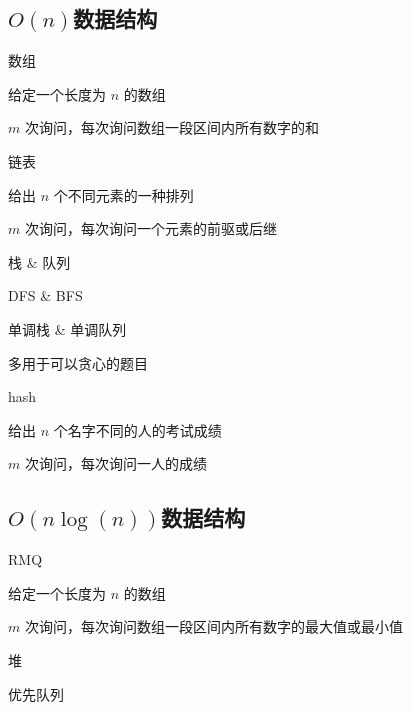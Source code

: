 \documentclass[UTF8]{beamer}
\begin{document}
		\subsection{$O(n)$数据结构}

			\begin{frame}{数组}

			给定一个长度为 $n$ 的数组

			$m$ 次询问，每次询问数组一段区间内所有数字的和

			\end{frame}

			\begin{frame}{链表}

			给出 $n$ 个不同元素的一种排列

			$m$ 次询问，每次询问一个元素的前驱或后继

			\end{frame}

			\begin{frame}{栈 \& 队列}

			DFS \& BFS

			\end{frame}

			\begin{frame}{单调栈 \& 单调队列}

			多用于可以贪心的题目

			\end{frame}

			\begin{frame}{hash}

			给出 $n$ 个名字不同的人的考试成绩

			$m$ 次询问，每次询问一人的成绩

			\end{frame}

		\subsection{$O(n\log(n))$数据结构}

			\begin{frame}{RMQ}

			给定一个长度为 $n$ 的数组

			$m$ 次询问，每次询问数组一段区间内所有数字的最大值或最小值

			\end{frame}

			\begin{frame}{堆}

			优先队列

			\end{frame}
\end{document}
